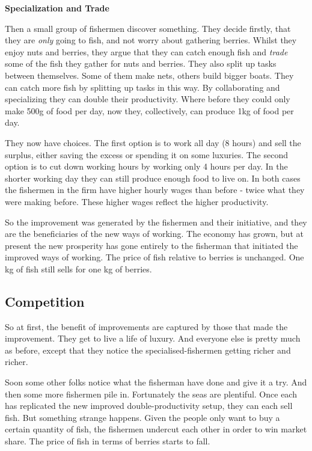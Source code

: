 \documentclass[]{tufte-handout}
\begin{document}
\textbf{Specialization and Trade}

Then a small group of fishermen discover something. They decide firstly,
that they are \emph{only} going to fish, and not worry about gathering
berries. Whilst they enjoy nuts and berries, they argue that they can
catch enough fish and \emph{trade} some of the fish they gather for nuts
and berries. They also split up tasks between themselves. Some of them
make nets, others build bigger boats. They can catch more fish by
splitting up tasks in this way. By collaborating and specializing they
can double their productivity. Where before they could only make 500g of
food per day, now they, collectively, can produce 1kg of food per day.

They now have choices. The first option is to work all day (8 hours) and
sell the surplus, either saving the excess or spending it on some
luxuries. The second option is to cut down working hours by working only
4 hours per day. In the shorter working day they can still produce
enough food to live on. In both cases the fishermen in the firm have
higher hourly wages than before - twice what they were making before.
These higher wages reflect the higher productivity.

So the improvement was generated by the fishermen and their initiative,
and they are the beneficiaries of the new ways of working. The economy
has grown, but at present the new prosperity has gone entirely to the
fisherman that initiated the improved ways of working. The price of fish
relative to berries is unchanged. One kg of fish still sells for one kg
of berries.

\hypertarget{competition}{%
\subsection{Competition}\label{competition}}

So at first, the benefit of improvements are captured by those that made
the improvement. They get to live a life of luxury. And everyone else is
pretty much as before, except that they notice the specialised-fishermen
getting richer and richer.

Soon some other folks notice what the fisherman have done and give it a
try. And then some more fishermen pile in. Fortunately the seas are
plentiful. Once each has replicated the new improved double-productivity
setup, they can each sell fish. But something strange happens. Given the
people only want to buy a certain quantity of fish, the fishermen
undercut each other in order to win market share. The price of fish in
terms of berries starts to fall.
\end{document}

